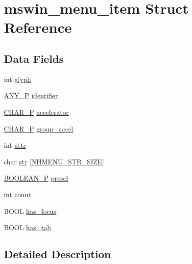 \hypertarget{structmswin__menu__item}{\section{mswin\+\_\+menu\+\_\+item Struct Reference}
\label{structmswin__menu__item}
}
\subsection*{Data Fields}
\begin{DoxyCompactItemize}
\item 
int \hyperlink{structmswin__menu__item_a9184b47db8a12d06f5247a420a9ece34}{glyph}
\item 
\hyperlink{wintype_8h_ae29f750de92b8a7c2566957e5863fbed}{A\+N\+Y\+\_\+\+P} \hyperlink{structmswin__menu__item_a0f461c71562a0e636598ff3a1c53556b}{identifier}
\item 
\hyperlink{wingem1_8c_ada878a8b4864a1658ee0f0acd5a89412}{C\+H\+A\+R\+\_\+\+P} \hyperlink{structmswin__menu__item_a68edbe01b9a5545b8d4c54fb70a51300}{accelerator}
\item 
\hyperlink{wingem1_8c_ada878a8b4864a1658ee0f0acd5a89412}{C\+H\+A\+R\+\_\+\+P} \hyperlink{structmswin__menu__item_a5bea5907e5c4306ea96e7fc784a82d73}{group\+\_\+accel}
\item 
int \hyperlink{structmswin__menu__item_aac16c04c8ecd7b7870d65034453cfd34}{attr}
\item 
char \hyperlink{structmswin__menu__item_a6644e3aa5c3da84efdad362cc01adc66}{str} \mbox{[}\hyperlink{win_2win32_2mhmenu_8c_a952b01afec1711bc486a207765acb1a6}{N\+H\+M\+E\+N\+U\+\_\+\+S\+T\+R\+\_\+\+S\+I\+Z\+E}\mbox{]}
\item 
\hyperlink{wingem1_8c_aa2723cc3af18a5199ab4ce7cca84d82b}{B\+O\+O\+L\+E\+A\+N\+\_\+\+P} \hyperlink{structmswin__menu__item_a6662294ee03513b5f0997810605aec39}{presel}
\item 
int \hyperlink{structmswin__menu__item_a28629e81df6ba5b0b67cf8309e20edaa}{count}
\item 
B\+O\+O\+L \hyperlink{structmswin__menu__item_ab880fce63154e7b3be65441f1f11f1c8}{has\+\_\+focus}
\item 
B\+O\+O\+L \hyperlink{structmswin__menu__item_ab310dbf6cbde678708f0b3de148470a8}{has\+\_\+tab}
\end{DoxyCompactItemize}


\subsection{Detailed Description}


